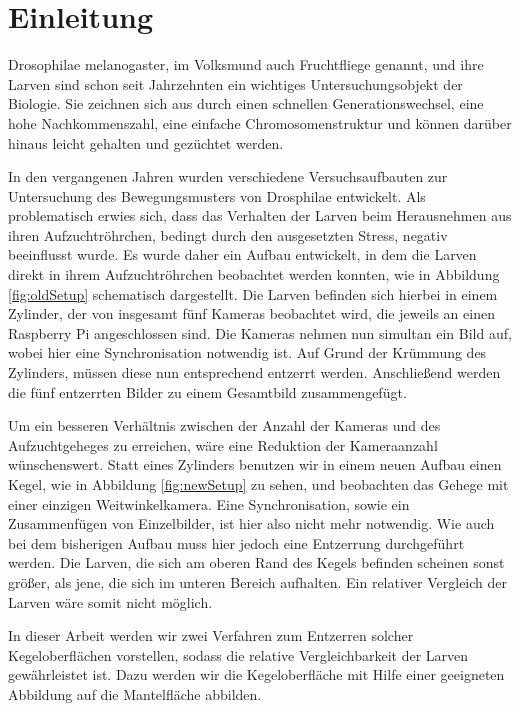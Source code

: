 \chapter{Einleitung}
Drosophilae melanogaster, im Volksmund auch Fruchtfliege genannt, und ihre Larven sind schon seit Jahrzehnten ein wichtiges Untersuchungsobjekt der Biologie. Sie zeichnen sich aus durch einen schnellen Generationswechsel, eine hohe Nachkommenszahl, eine einfache Chromosomenstruktur und können darüber hinaus leicht gehalten und gezüchtet werden.

In den vergangenen Jahren wurden verschiedene Versuchsaufbauten zur Untersuchung des Bewegungsmusters von Drosphilae entwickelt.
Als problematisch erwies sich, dass das Verhalten der Larven beim Herausnehmen aus ihren Aufzuchtröhrchen, bedingt durch den ausgesetzten Stress, negativ beeinflusst wurde.
Es wurde daher ein Aufbau entwickelt, in dem die Larven direkt in ihrem Aufzuchtröhrchen beobachtet werden konnten, wie in Abbildung \ref{fig:oldSetup} schematisch dargestellt.
Die Larven befinden sich hierbei in einem Zylinder, der von insgesamt fünf Kameras beobachtet wird, die jeweils an einen Raspberry Pi angeschlossen sind. Die Kameras nehmen nun simultan ein Bild auf, wobei hier eine Synchronisation notwendig ist. Auf Grund der Krümmung des Zylinders, müssen diese nun entsprechend entzerrt werden. Anschließend werden die fünf entzerrten Bilder zu einem Gesamtbild zusammengefügt.

Um ein besseren Verhältnis zwischen der Anzahl der Kameras und des Aufzuchtgeheges zu erreichen, wäre eine Reduktion der Kameraanzahl wünschenswert.
Statt eines Zylinders benutzen wir in einem neuen Aufbau einen Kegel, wie in Abbildung \ref{fig:newSetup} zu sehen, und beobachten das Gehege mit einer einzigen Weitwinkelkamera. Eine Synchronisation, sowie ein Zusammenfügen von Einzelbilder, ist hier also nicht mehr notwendig.
Wie auch bei dem bisherigen Aufbau muss hier jedoch eine Entzerrung durchgeführt werden. Die Larven, die sich am oberen Rand des Kegels befinden scheinen sonst größer, als jene, die sich im unteren Bereich aufhalten. Ein relativer Vergleich der Larven wäre somit nicht möglich.

In dieser Arbeit werden wir zwei Verfahren zum Entzerren solcher Kegeloberflächen vorstellen, sodass die relative Vergleichbarkeit der Larven gewährleistet ist.
Dazu werden wir die Kegeloberfläche mit Hilfe einer geeigneten Abbildung auf die Mantelfläche abbilden.

